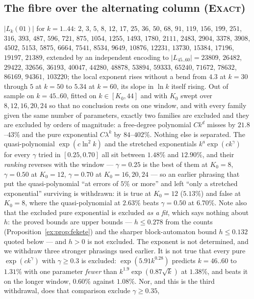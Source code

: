 \documentclass[11pt]{article}
\theoremstyle{definition}
\theoremstyle{remark}
\newcommand{\EXACT}{\textsc{Exact}}
\begin{document}
\subsection*{The fibre over the alternating column (\EXACT)}
$|L_k(01)|$ for $k=1..44$: $2$, $3$, $5$, $8$, $12$, $17$, $25$, $36$, $50$, $68$, $91$, $119$, $156$, $199$, $251$, $316$, $393$, $487$, $596$, $721$, $875$, $1054$, $1255$, $1493$, $1780$, $2111$, $2483$, $2904$, $3378$, $3908$, $4502$, $5153$, $5875$, $6664$, $7541$, $8534$, $9649$, $10876$, $12231$, $13730$, $15384$, $17196$, $19197$, $21389$, extended by an independent encoding to $|L_{45..60}|=23809$, $26482$, $29422$, $32656$, $36193$, $40047$, $44280$, $48878$, $53894$, $59333$, $65240$, $71672$, $78632$, $86169$, $94361$, $103220$; the local exponent rises without a bend from $4.3$ at $k=30$ through $5$ at $k=50$ to $5.34$ at $k=60$, its slope in $\ln k$ itself rising. Out of sample on $k=45..60$, fitted on $k\in[K_0,44]$ and with $K_0$ swept over $8,12,16,20,24$ so that no conclusion rests on one window, and with every family given the same number of parameters, exactly two families are excluded and they are excluded by orders of magnitude: a free-degree polynomial $Ck^{d}$ misses by $21.8$--$43\%$ and the pure exponential $C\lambda^{k}$ by $84$--$402\%$. Nothing else is separated. The quasi-polynomial $\exp(c\ln^2k)$ and the stretched exponentials $k^{a}\exp(ck^{\gamma})$ for every $\gamma$ tried in $[0.25,0.70]$ all sit between $1.48\%$ and $12.90\%$, and their \emph{ranking} reverses with the window --- $\gamma=0.25$ is the best of them at $K_0=8$, $\gamma=0.50$ at $K_0=12$, $\gamma=0.70$ at $K_0=16,20,24$ --- so an earlier phrasing that put the quasi-polynomial ``at errors of $5\%$ or more'' and left ``only a stretched exponential'' surviving is withdrawn: it is true at $K_0=12$ ($5.13\%$) and false at $K_0=8$, where the quasi-polynomial at $2.63\%$ beats $\gamma=0.50$ at $6.70\%$. Note also that the excluded pure exponential is excluded \emph{as a fit}, which says nothing about $h$: the proved bounds are upper bounds --- $h\le0.278$ from the counts (Proposition~\ref{ex:prop:fekete}) and the sharper block-automaton bound $h\le0.132$ quoted below --- and $h>0$ is not excluded. The exponent is not determined, and
we withdraw three stronger phrasings used earlier. It is not true that every pure $\exp(ck^\gamma)$ with
$\gamma\ge0.3$ is excluded: $\exp(5.91k^{0.28})$ predicts $k=46..60$ to $1.31\%$ with one parameter
\emph{fewer} than $k^{1.9}\exp(0.87\sqrt k)$ at $1.38\%$, and beats it on the longer window, $0.60\%$
against $1.08\%$. Nor, and this is the third withdrawal, does that comparison exclude $\gamma\ge0.35$,
\end{document}

